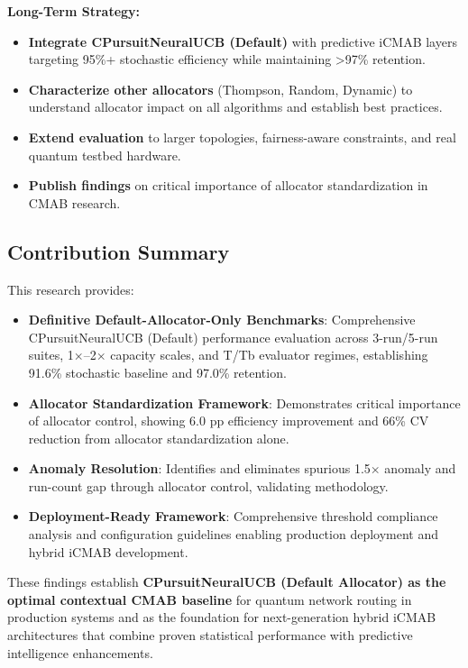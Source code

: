 \documentclass[12pt,a4paper]{article}
\newcommand{\success}[1]{\textcolor{successcolor}{\textbf{#1}}}
\begin{document}
\textbf{Long-Term Strategy:}
\begin{itemize}
\item \success{Integrate CPursuitNeuralUCB (Default)} with predictive iCMAB layers targeting 95\%+ stochastic efficiency while maintaining >97\% retention.

\item \success{Characterize other allocators} (Thompson, Random, Dynamic) to understand allocator impact on all algorithms and establish best practices.

\item \success{Extend evaluation} to larger topologies, fairness-aware constraints, and real quantum testbed hardware.

\item \success{Publish findings} on critical importance of allocator standardization in CMAB research.
\end{itemize}

\subsection{Contribution Summary}

This research provides:

\begin{itemize}
\item \success{\textbf{Definitive Default-Allocator-Only Benchmarks}}: Comprehensive CPursuitNeuralUCB (Default) performance evaluation across 3-run/5-run suites, 1$\times$–2$\times$ capacity scales, and T/Tb evaluator regimes, establishing 91.6\% stochastic baseline and 97.0\% retention.

\item \success{\textbf{Allocator Standardization Framework}}: Demonstrates critical importance of allocator control, showing 6.0 pp efficiency improvement and 66\% CV reduction from allocator standardization alone.

\item \success{\textbf{Anomaly Resolution}}: Identifies and eliminates spurious 1.5$\times$ anomaly and run-count gap through allocator control, validating methodology.

\item \success{\textbf{Deployment-Ready Framework}}: Comprehensive threshold compliance analysis and configuration guidelines enabling production deployment and hybrid iCMAB development.
\end{itemize}

These findings establish \success{\textbf{CPursuitNeuralUCB (Default Allocator) as the optimal contextual CMAB baseline}} for quantum network routing in production systems and as the foundation for next-generation hybrid iCMAB architectures that combine proven statistical performance with predictive intelligence enhancements.
\end{document}

